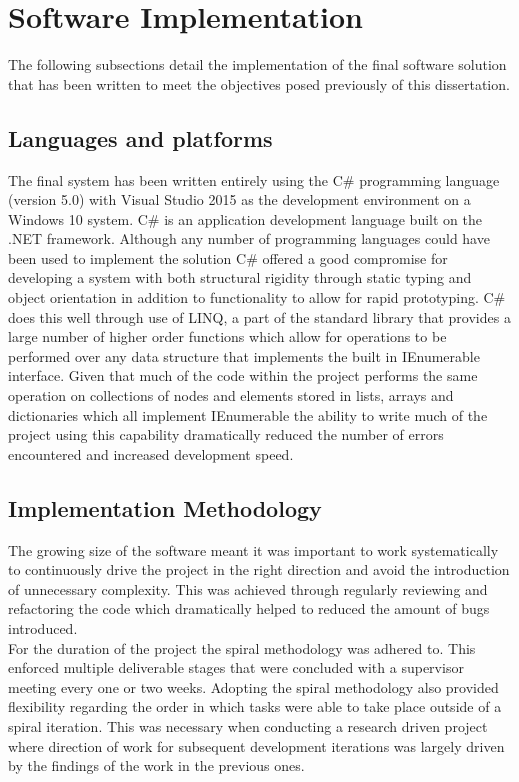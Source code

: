 
\section{Software Implementation}
The following subsections detail the implementation of the final software solution that has been written to meet the objectives posed previously of this dissertation.

\subsection{Languages and platforms}
The final system has been written entirely using the C\# programming language (version 5.0) with Visual Studio 2015 as the development environment on a Windows 10 system. C\# is an application development language built on the .NET framework. Although any number of programming languages could have been used to implement the solution C\# offered a good compromise for developing a system with both structural rigidity through static typing and object orientation in addition to functionality to allow for rapid prototyping. C\# does this well through use of LINQ, a part of the standard library that provides a large number of higher order functions which allow for operations to be performed over any data structure that implements the built in IEnumerable interface. Given that much of the code within the project performs the same operation on collections of nodes and elements stored in lists, arrays and dictionaries which all implement IEnumerable the ability to write much of the project using this capability dramatically reduced the number of errors encountered and increased development speed.


\subsection{Implementation Methodology}
The growing size of the software meant it was important to work systematically to continuously drive the project in the right direction and avoid the introduction of unnecessary complexity. This was achieved through regularly reviewing and refactoring the code which dramatically helped to reduced the amount of bugs introduced. \\

\noindent
For the duration of the project the spiral methodology was adhered to. This enforced multiple deliverable stages that were concluded with a supervisor meeting every one or two weeks. Adopting the spiral methodology also provided flexibility regarding the order in which tasks were able to take place outside of a spiral iteration. This was necessary when conducting a research driven project where direction of work for subsequent development iterations was largely driven by the  findings of the work in the previous ones. \\

